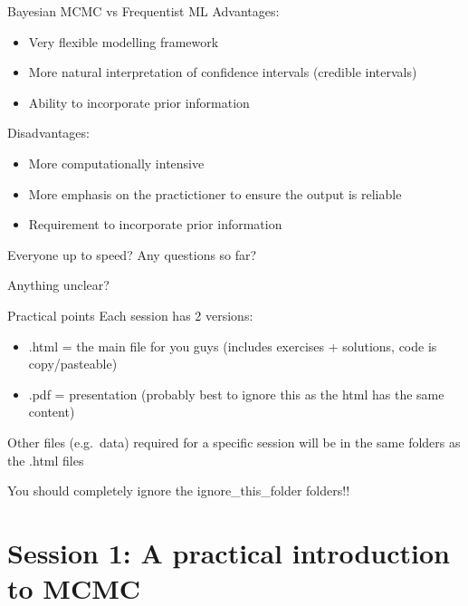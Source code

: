 \documentclass[
  ignorenonframetext,
  aspectratio=169,
]{beamer}
\providecommand{\tightlist}{%
  \setlength{\itemsep}{0pt}\setlength{\parskip}{0pt}}
\begin{document}
\begin{frame}{Bayesian MCMC vs Frequentist ML}
\protect\hypertarget{bayesian-mcmc-vs-frequentist-ml}{}
Advantages:

\begin{itemize}
\tightlist
\item
  Very flexible modelling framework
\item
  More natural interpretation of confidence intervals (credible
  intervals)
\item
  Ability to incorporate prior information
\end{itemize}

\pause

Disadvantages:

\begin{itemize}
\tightlist
\item
  More computationally intensive
\item
  More emphasis on the practictioner to ensure the output is reliable
\item
  Requirement to incorporate prior information
\end{itemize}
\end{frame}

\begin{frame}{Everyone up to speed?}
\protect\hypertarget{everyone-up-to-speed}{}
Any questions so far?

Anything unclear?
\end{frame}

\begin{frame}{Practical points}
\protect\hypertarget{practical-points}{}
Each session has 2 versions:

\begin{itemize}
\item
  .html = the main file for you guys (includes exercises + solutions,
  code is copy/pasteable)
\item
  .pdf = presentation (probably best to ignore this as the html has the
  same content)
\end{itemize}

\pause

Other files (e.g.~data) required for a specific session will be in the
same folders as the .html files

\pause

You should completely ignore the ignore\_this\_folder folders!!
\end{frame}

\hypertarget{session-1-a-practical-introduction-to-mcmc}{%
\section{Session 1: A practical introduction to
MCMC}\label{session-1-a-practical-introduction-to-mcmc}}
\end{document}
